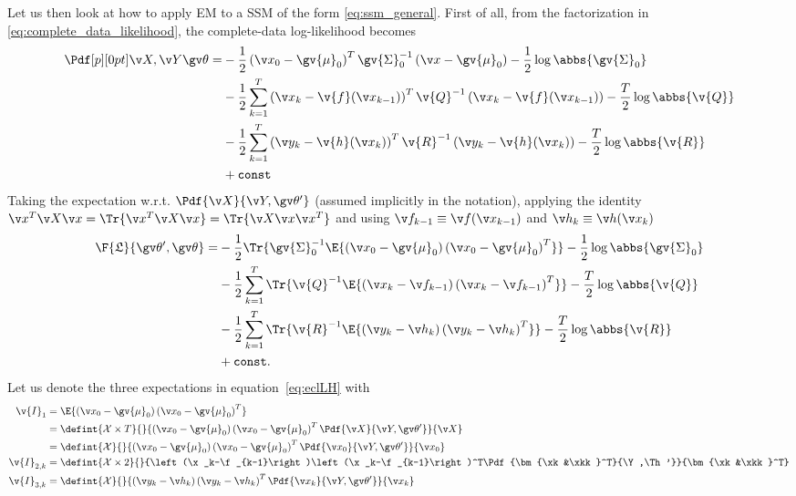 Let us then look at how to apply EM to a SSM of the form \eqref{eq:ssm_general}. First of
all, from the factorization in \eqref{eq:complete_data_likelihood}, the complete-data log-likelihood becomes
\begin{align*}
\begin{split}
	\cLH =&-\frac{1}{2}\left(\x_0-\gv{\mu}_0\right)^T\gv{\Sigma}_0^{-1}\left(\x-\gv{\mu}_0\right)-\frac{1}{2}\log\abbs{\gv{\Sigma}_0}\\
	&-\frac{1}{2}\sum_{k=1}^T\left(\x_k-\v{f}(\x_{k-1})\right)^T\v{Q}^{-1}\left(\x_k-\v{f}(\x_{k-1})\right)-\frac{T}{2}\log\abbs{\v{Q}}\\
	&-\frac{1}{2}\sum_{k=1}^T\left(\y_k-\v{h}(\x_{k})\right)^T\v{R}^{-1}\left(\y_k-\v{h}(\x_{k})\right)-\frac{T}{2}\log\abbs{\v{R}}\\
	&+\mathtt{const}
\end{split}
\end{align*}
Taking the expectation w.r.t. $\Pdf{\X}{\Y,\Th'}$ (assumed implicitly in the notation), applying the identity $\x^T\X\x=\Tr{\x^T\X\x}=\Tr{\X\x\x^T}$
and using $\f_{k-1}\equiv \f(\x_{k-1})$ and $\h_k\equiv \h(\x_k)$
\begin{align}
\begin{split}
	\F{\Lb}{\Th',\Th} =&-\frac{1}{2}\Tr{\gv{\Sigma}_0^{-1}\E{\left(\x_0-\gv{\mu}_0\right)\left(\x_0-\gv{\mu}_0\right)^T}}-\frac{1}{2}\log\abbs{\gv{\Sigma}_0}\\
	&-\frac{1}{2}\sum_{k=1}^T\Tr{\v{Q}^{-1}\E{\left(\x_k-\f_{k-1}\right)\left(\x_k-\f_{k-1}\right)^T}}-\frac{T}{2}\log\abbs{\v{Q}}\\
	&-\frac{1}{2}\sum_{k=1}^T\Tr{\v{R}^{-1}\E{\left(\y_k-\h_{k}\right)\left(\y_k-\h_{k}\right)^T}}-\frac{T}{2}\log\abbs{\v{R}}\\
	&+\mathtt{const}.
\end{split}
\label{eq:eclLH}
\end{align} 
Let us denote the three expectations in equation~\eqref{eq:eclLH} with
\begin{align}
	\v{I}_1 &= \E{\left(\x_0-\gv{\mu}_0\right)\left(\x_0-\gv{\mu}_0\right)^T}\\ 
	&=\defint{\mathcal{X}\times T}{}{\left(\x_0-\gv{\mu}_0\right)\left(\x_0-\gv{\mu}_0\right)^T\Pdf{\X}{\Y,\Th'}}{\X}\nonumber\\
	&= 	\defint{\mathcal{X}}{}{\left(\x_0-\gv{\mu}_0\right)\left(\x_0-\gv{\mu}_0\right)^T\Pdf{\x_0}{\Y,\Th'}}{\x_0}\\
	\v{I}_{2,k} &= \defint{\mathcal{X}\times 2}{}{\left(\x_k-\f_{k-1}\right)\left(\x_k-\f_{k-1}\right)^T\Pdf{\bm{\xk&\xkk}^T}{\Y,\Th'}}{\bm{\xk&\xkk}^T}\\
	\v{I}_{3,k} &= \defint{\mathcal{X}}{}{\left(\y_k-\h_{k}\right)\left(\y_k-\h_{k}\right)^T\Pdf{\xk}{\Y,\Th'}}{\xk}
\end{align}
